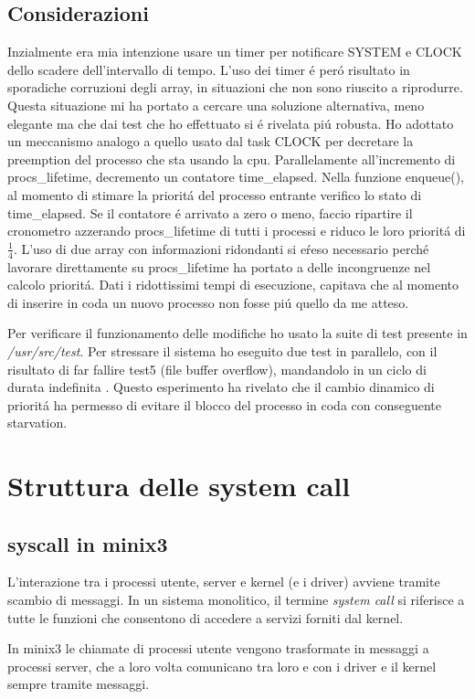 \documentclass[a4paper,12pt]{report}
\begin{document}
\section{Considerazioni}
Inzialmente era mia intenzione usare un timer per notificare
SYSTEM e CLOCK dello scadere dell'intervallo di tempo.
L'uso dei timer \'e per\'o risultato in sporadiche corruzioni degli array,
in situazioni che non sono riuscito a riprodurre.
Questa situazione mi ha portato a cercare una soluzione alternativa, meno
elegante ma che dai test che ho effettuato si \'e rivelata pi\'u robusta.
Ho adottato un meccanismo analogo a quello usato dal task CLOCK per
decretare la preemption del processo che sta usando la cpu.
Parallelamente all'incremento di procs\_lifetime, decremento un contatore
time\_elapsed. Nella funzione enqueue(), al momento di stimare la priorit\'a
del processo entrante verifico lo stato di time\_elapsed. Se il contatore
\'e arrivato a zero o meno, faccio ripartire il cronometro azzerando
procs\_lifetime di tutti i processi e riduco le loro priorit\'a di
$\frac{1}{4}$.
L'uso di due array con informazioni ridondanti si e\' reso necessario
perch\'e lavorare direttamente su procs\_lifetime ha portato a delle
incongruenze nel calcolo priorit\'a. Dati i ridottissimi tempi di
esecuzione, capitava che al momento di inserire in coda un nuovo processo
non fosse pi\'u quello da me atteso.

Per verificare il funzionamento delle modifiche ho usato la suite di  test
presente in \textit{/usr/src/test}.
Per stressare il sistema ho eseguito due test in parallelo, con il risultato
di far fallire test5 (file buffer overflow), mandandolo in un ciclo di
durata indefinita . Questo esperimento ha rivelato che il cambio dinamico di
priorit\'a ha permesso di evitare il blocco del processo in coda con
conseguente starvation.


\chapter{Struttura delle system call}
\section{syscall in minix3}
L'interazione tra i processi utente, server e kernel (e i driver) avviene 
tramite scambio di messaggi.
In un sistema monolitico, il termine \textit{system call} si riferisce a
tutte le funzioni che consentono di accedere a servizi forniti dal kernel.

In minix3 le chiamate di processi utente vengono trasformate in messaggi a
processi server, che a loro volta comunicano tra loro e con i driver e il
kernel sempre tramite messaggi.
\end{document}

